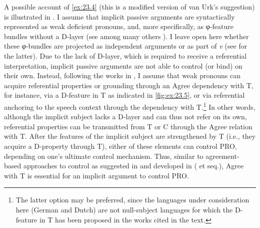 \documentclass[output=paper]{langsci/langscibook}
\begin{document}
A possible account of \eqref{ex:23.4} (this is a modified version of van Urk’s
suggestion)\largerpage[2]\relax{} is illustrated in . I
assume that implicit passive arguments are syntactically
represented as weak deficient pronouns, and, more specifically, as
φ-feature bundles without a D-layer  (see among many others
\citealt{CarSta1999,DecWil2002,Landau2010,Roberts2010,Roberts2010c}). I leave
open here whether these φ-bundles are projected as independent arguments or as
part of \emph{v} (see \citealt{Legate2012,Legate2014} for the latter). Due to
the lack of D-layer, which is required to receive a referential interpretation,
implicit passive arguments are not able to control (or bind) on
their own.  Instead, following the works in \citet{BibHolRobShee2010}, I assume
that weak pronouns can acquire referential properties or grounding through an
Agree dependency with T, for instance, via a D-feature in T as indicated in
\eqref{fig:ex:23.5}, or via referential anchoring to the speech context through
the dependency with T.\footnote{The latter option may be preferred, since the
languages under consideration here (German and Dutch) are not null-subject
languages for which the D-feature in T has been proposed in the works cited in
the text.} In other words, although the implicit subject lacks a D-layer and
can thus not refer on its own, referential properties can be transmitted from T
or C through the Agree relation with T. After the features of the implicit
subject are strengthened by T (i.e., they acquire a D-property through T),
either of these elements can control PRO, depending on one’s ultimate control
mechanism. Thus, similar to agreement-based approaches to control as suggested
in \citet{Borer1989} and developed in \citeauthor{Landau2000}
(\citeyear{Landau2000} et seq.), Agree with T is essential for an implicit
argument to control PRO.
\end{document}
